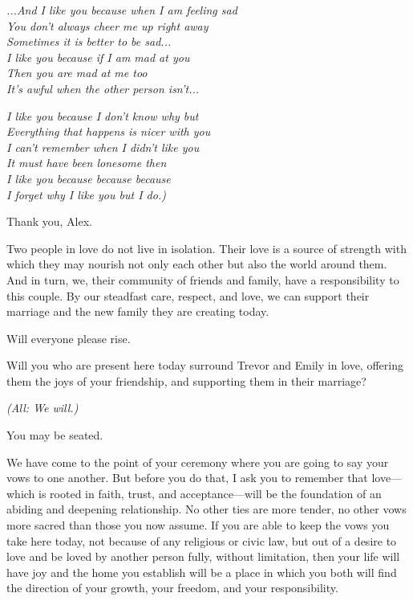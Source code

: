 \documentclass[12pt]{article}
\begin{document}
\textsl{...And I like you because when I am feeling sad \\
  You don't always cheer me up right away \\
  Sometimes it is better to be sad... \\
  I like you because if I am mad at you \\
  Then you are mad at me too \\
  It's awful when the other person isn't...} \par

\textsl{I like you because I don't know why but \\
  Everything that happens is nicer with you \\
  I can't remember when I didn't like you \\
  It must have been lonesome then \\
  I like you because because because \\
  I forget why I like you but I do.) }\par

Thank you, Alex.

Two people in love do not live in isolation. Their love is a source of
strength with which they may nourish not only each other but also the
world around them. And in turn, we, their community of friends and
family, have a responsibility to this couple. By our steadfast care,
respect, and love, we can support their marriage and the new family
they are creating today. \par

Will everyone please rise. \par

Will you who are present here today surround Trevor and Emily in love,
offering them the joys of your friendship, and supporting them in
their marriage? \par

\textsl{(All: We will.)} \par

You may be seated.

We have come to the point of your ceremony where you are going to say
your vows to one another. But before you do that, I ask you to
remember that love---which is rooted in faith, trust, and
acceptance---will be the foundation of an abiding and deepening
relationship. No other ties are more tender, no other vows more sacred
than those you now assume. If you are able to keep the vows you take
here today, not because of any religious or civic law, but out of a
desire to love and be loved by another person fully, without
limitation, then your life will have joy and the home you establish
will be a place in which you both will find the direction of your
growth, your freedom, and your responsibility. \par
\end{document}

